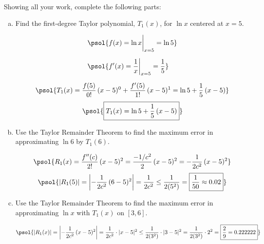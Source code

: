 \documentclass[12pt,letterpaper]{exam}
\begin{document}
\begin{questions}
\newpage
\question[16] Showing all your work, complete the following parts: 
	\begin{enumerate}[(a)]
	\item Find the first-degree Taylor polynomial, $T_1(x)$, for $\ln x$ centered at $x= 5$. \par\vspace{0.3cm}
		\[
		\begin{aligned}
		&\psol{f(x)= \ln x \bigg|_{x=5}= \ln 5} \\[0.2cm]
		&\psol{f'(x)= \dfrac{1}{x} \bigg|_{x=5}= \dfrac{1}{5}}
		\end{aligned}
		\] \par\vspace{0.2cm}
		\[
		\psol{T_1(x)= \dfrac{f(5)}{0!}\, (x - 5)^0 + \dfrac{f'(5)}{1!}\, (x - 5)^1= \ln 5 + \dfrac{1}{5} \, (x - 5)}
		\]
		\[
		\psol{\boxed{T_1(x)= \ln 5 + \dfrac{1}{5} \, (x - 5)}}
		\] \par\vspace{0.3cm}
	
	\item Use the Taylor Remainder Theorem to find the maximum error in approximating $\ln 6$  by $T_1(6)$. \par\vspace{0.3cm}
		\[
		\psol{R_1(x)= \dfrac{f''(c)}{2!} \,(x - 5)^2= \dfrac{-1/c^2}{2} \,(x - 5)^2= -\dfrac{1}{2c^2} \,(x - 5)^2}
		\]
		\[
		\psol{|R_1(5)|= \left| -\dfrac{1}{2c^2} \,(6 - 5)^2 \right|= \dfrac{1}{2c^2} \leq \dfrac{1}{2(5^2)}= \boxed{\dfrac{1}{50} \approx 0.02}}
		\] \par\vspace{0.7cm}
	
	\item Use the Taylor Remainder Theorem to find the maximum error in approximating $\ln x$ with $T_1(x)$ on $[3, 6]$. \par\vspace{0.3cm}
		\[
		\psol{|R_1(x)|= \left| -\dfrac{1}{2c^2} \,(x - 5)^2 \right|= \dfrac{1}{2c^2} \cdot |x - 5|^2 \leq \dfrac{1}{2(3^2)} \cdot |3 - 5|^2= \dfrac{1}{2(3^2)} \cdot 2^2= \boxed{\dfrac{2}{9}= 0.222222}}
		\]
	\end{enumerate}




\end{questions}
\end{document}
